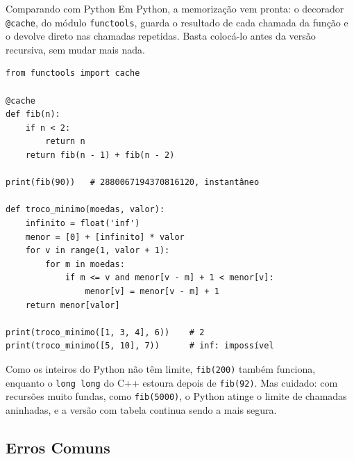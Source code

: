 \begin{destaque}{Comparando com Python}
Em Python, a memorização vem pronta: o decorador \texttt{@cache}, do módulo \texttt{functools}, guarda o resultado de cada chamada da função e o devolve direto nas chamadas repetidas. Basta colocá-lo antes da versão recursiva, sem mudar mais nada.

\begin{codigo}
\begin{Verbatim}[breaklines=true, breaksymbolleft={}, fontsize=\footnotesize]
from functools import cache

@cache
def fib(n):
    if n < 2:
        return n
    return fib(n - 1) + fib(n - 2)

print(fib(90))   # 2880067194370816120, instantâneo

def troco_minimo(moedas, valor):
    infinito = float('inf')
    menor = [0] + [infinito] * valor
    for v in range(1, valor + 1):
        for m in moedas:
            if m <= v and menor[v - m] + 1 < menor[v]:
                menor[v] = menor[v - m] + 1
    return menor[valor]

print(troco_minimo([1, 3, 4], 6))    # 2
print(troco_minimo([5, 10], 7))      # inf: impossível
\end{Verbatim}
\end{codigo}

Como os inteiros do Python não têm limite, \texttt{fib(200)} também funciona, enquanto o \texttt{long long} do C++ estoura depois de \texttt{fib(92)}. Mas cuidado: com recursões muito fundas, como \texttt{fib(5000)}, o Python atinge o limite de chamadas aninhadas, e a versão com tabela continua sendo a mais segura.
\end{destaque}

\subsection{Erros Comuns}

